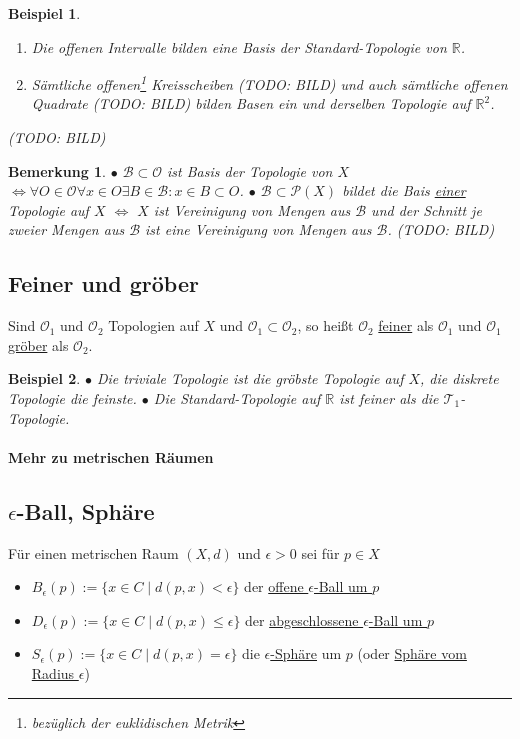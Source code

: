 \documentclass[a4paper,11pt,notitlepage]{report}
\newtheorem{remark}{Bemerkung}[chapter]
\newtheorem{example}{Beispiel}[chapter]
\newcommand{\R}{{\ensuremath{\mathbb{R}}}}
\newcommand{\OO}{{\ensuremath{\mathcal{O}}}}
\newenvironment{Kasten}[1]
{
\hspace{0.05\linewidth}
\begin{center}
\begin{minipage}{0.9\linewidth}
\setlength{\fboxsep}{10pt}
\definecolor{shadecolor}{gray}{1}
\definecolor{framecolor}{gray}{0}
\def\FrameCommand{\fcolorbox{framecolor}{shadecolor}}
\MakeFramed {\FrameRestore}
\subsection{#1}
\begin{itshape}
}
{
\end{itshape}
\endMakeFramed
\end{minipage}
\end{center}
}
\begin{document}
\begin{example}
	\begin{enumerate}[(1)]
		\item Die offenen Intervalle bilden eine Basis der Standard-Topologie von $\R$.
		\item Sämtliche offenen\footnote{bezüglich der euklidischen Metrik} Kreisscheiben (TODO: BILD) und auch sämtliche offenen Quadrate (TODO: BILD) bilden Basen ein und derselben Topologie auf $\R^2$.
	\end{enumerate}
	(TODO: BILD)
\end{example}

\begin{remark}
	$\bullet$ $\mathcal{B} \subset \OO$ ist Basis der Topologie von $X$ $\Leftrightarrow \forall O \in \OO \forall x \in O \exists B \in \mathcal{B} \colon x \in B \subset O$.
	\newline
	$\bullet$ $\mathcal{B} \subset \mathcal{P}(X)$ bildet die Bais \underline{einer} Topologie auf $X$ $\Leftrightarrow$ $X$ ist Vereinigung von Mengen aus $\mathcal{B}$ und der Schnitt je zweier Mengen aus $\mathcal{B}$ ist eine Vereinigung von Mengen aus $\mathcal{B}$.
	\newline
	(TODO: BILD)
\end{remark}

\begin{Kasten}{Feiner und gröber}
	Sind $\OO_1$ und $\OO_2$ Topologien auf $X$ und $\OO_1 \subset \OO_2$, so heißt $\OO_2$ \underline{feiner} als $\OO_1$ und $\OO_1$ \underline{gröber} als $\OO_2$.
\end{Kasten}

\begin{example}
	$\bullet$ Die triviale Topologie ist die gröbste Topologie auf $X$, die diskrete Topologie die feinste.
	\newline
	$\bullet$ Die Standard-Topologie auf $\R$ ist feiner als die $\mathcal{T}_1$-Topologie.
\end{example}

\paragraph{Mehr zu metrischen Räumen}

\begin{Kasten}{$\epsilon$-Ball, Sphäre}
	Für einen metrischen Raum $(X,d)$ und $\epsilon > 0$ sei für $p \in X$
	\begin{itemize}
		\item $B_\epsilon(p):=\{x \in C \mid d(p,x) < \epsilon \}$ der \underline{offene $\epsilon$-Ball um $p$}
		\item $D_\epsilon(p):=\{x \in C \mid d(p,x) \leq \epsilon \}$ der \underline{abgeschlossene $\epsilon$-Ball um $p$}
		\item $S_\epsilon(p):=\{x \in C \mid d(p,x) = \epsilon \}$ die \underline{ $\epsilon$-Sphäre} um $p$ (oder \underline{Sphäre vom Radius $\epsilon$})
	\end{itemize}
\end{Kasten}
\end{document}
